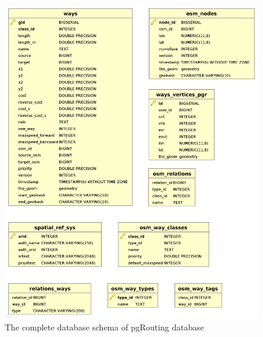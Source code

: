 \begin{figure}
\includegraphics[scale=.2]{pgrouting.png}
\caption{The complete database schema of pgRouting database}
\label{fg:db}
\end{figure}



